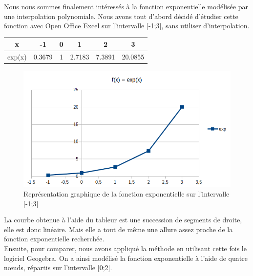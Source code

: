 \documentclass{article}
\begin{document}
Nous nous sommes finalement int\'{e}ress\'{e}s \`a la fonction exponentielle mod\'{e}lis\'{e}e par une interpolation polynomiale. 
Nous avons tout d'abord d\'{e}cid\'{e} d'\'{e}tudier cette fonction avec Open Office Excel sur l'intervalle [-1;3], sans utiliser d'interpolation.\\

\begin{center}
\begin{table}[!hbp]
\begin{center}
\begin{tabular}{|c|c|c|c|c|c|}
\hline
\hline
 x & -1 & 0 & 1 & 2 & 3 \\
\hline
 exp(x) & 0.3679 & 1 & 2.7183 & 7.3891 & 20.0855 \\
\hline
\end{tabular}
\end{center}
\end{table} 
\end{center}

\begin{figure}[h]
	\centering
	\includegraphics[width=12cm]{FctExpExcel.png}
	\caption{Repr\'{e}sentation graphique de la fonction exponentielle sur l'intervalle [-1;3] }
\end{figure}

La courbe obtenue \`a l'aide du tableur est une succession de segments de droite, elle est donc lin\'{e}aire. Mais elle a tout de m\^{e}me une allure assez proche de la fonction exponentielle recherch\'{e}e.\\
Ensuite, pour comparer, nous avons appliqu\'{e} la m\'{e}thode en utilisant cette fois le logiciel Geogebra. On a ainsi mod\'{e}lis\'{e} la fonction exponentielle \`a l'aide de quatre n\oe uds, r\'{e}partis sur l'intervalle [0;2].
\end{document}
